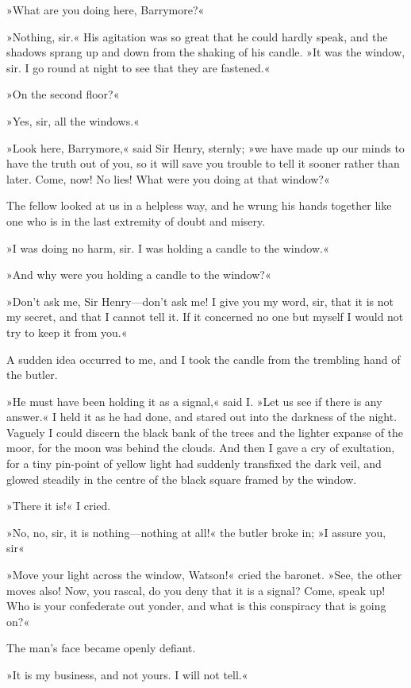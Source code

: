 »What are you doing here, Barrymore?«

»Nothing, sir.« His agitation was so great that he could hardly speak, and the shadows sprang up and down from the shaking of his candle. »It was the window, sir. I go round at night to see that they are fastened.«

»On the second floor?«

»Yes, sir, all the windows.«

»Look here, Barrymore,« said Sir Henry, sternly; »we have made up our minds to have the truth out of you, so it will save you trouble to tell it sooner rather than later. Come, now! No lies! What were you doing at that window?«

The fellow looked at us in a helpless way, and he wrung his hands together like one who is in the last extremity of doubt and misery.

»I was doing no harm, sir. I was holding a candle to the window.«

»And why were you holding a candle to the window?«

»Don't ask me, Sir Henry—don't ask me! I give you my word, sir, that it is not my secret, and that I cannot tell it. If it concerned no one but myself I would not try to keep it from you.«

A sudden idea occurred to me, and I took the candle from the trembling hand of the butler.

»He must have been holding it as a signal,« said I. »Let us see if there is any answer.« I held it as he had done, and stared out into the darkness of the night. Vaguely I could discern the black bank of the trees and the lighter expanse of the moor, for the moon was behind the clouds. And then I gave a cry of exultation, for a tiny pin-point of yellow light had suddenly transfixed the dark veil, and glowed steadily in the centre of the black square framed by the window.

»There it is!« I cried.

»No, no, sir, it is nothing—nothing at all!« the butler broke in; »I assure you, sir\longdash«

»Move your light across the window, Watson!« cried the baronet. »See, the other moves also! Now, you rascal, do you deny that it is a signal? Come, speak up! Who is your confederate out yonder, and what is this conspiracy that is going on?«

The man's face became openly defiant.

»It is my business, and not yours. I will not tell.«

